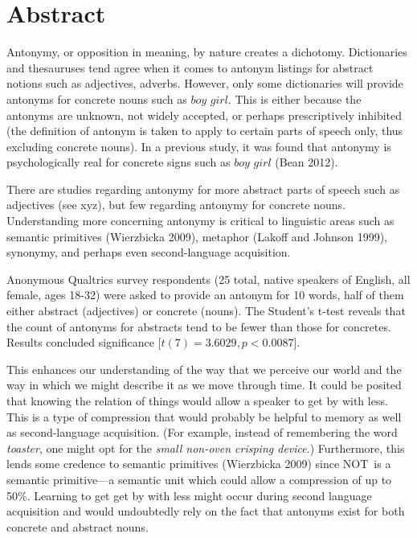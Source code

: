 \clearpage
\section {Abstract}
Antonymy, or opposition in meaning, by nature creates a dichotomy.  Dictionaries and thesauruses tend agree when it comes to antonym listings for abstract notions such as adjectives, adverbs.  However, only some dictionaries will provide antonyms for concrete nouns such as $boy$ \opp $girl$.  This is either because the antonyms are unknown, not widely accepted, or perhaps prescriptively inhibited (the definition of antonym is taken to apply to certain parts of speech only, thus excluding concrete nouns).  In a previous study, it was found that antonymy is psychologically real for concrete signs such as $boy$ \opp $girl$ (Bean 2012).  

There are studies regarding antonymy for more abstract parts of speech such as adjectives (see xyz), but few regarding antonymy for concrete nouns.  Understanding more concerning antonymy is critical to linguistic areas such as semantic primitives (Wierzbicka 2009), metaphor (Lakoff and Johnson 1999), synonymy, and perhaps even second-language acquisition.  

Anonymous Qualtrics survey respondents (25 total, native speakers of English, all female, ages 18-32)
 were asked to provide an antonym for 10 words, half of them either abstract (adjectives) or concrete (nouns).  The Student’s t-test reveals that the count of antonyms for abstracts tend to be fewer than those for concretes.  Results concluded significance [$t(7) = 3.6029, p < 0.0087$].  


This enhances our understanding of the way that we perceive our world and the way in which we might describe it as we move through time.  It could be posited that knowing the relation of things would allow a speaker to get by with less. This is a type of compression that would probably be helpful to memory as well as second-language acquisition.  (For example, instead of remembering the word \textit {toaster}, one might opt for the \textit {small non-oven crisping device}\footnotemark.)  Furthermore, this lends some credence to semantic primitives (Wierzbicka 2009) since NOT\footnotemark~is a semantic primitive---a semantic unit which could allow a compression of up to 50\%.  Learning to get get by with less might occur during second language acquisition and would undoubtedly rely on the fact that antonyms exist for both concrete and abstract nouns.

